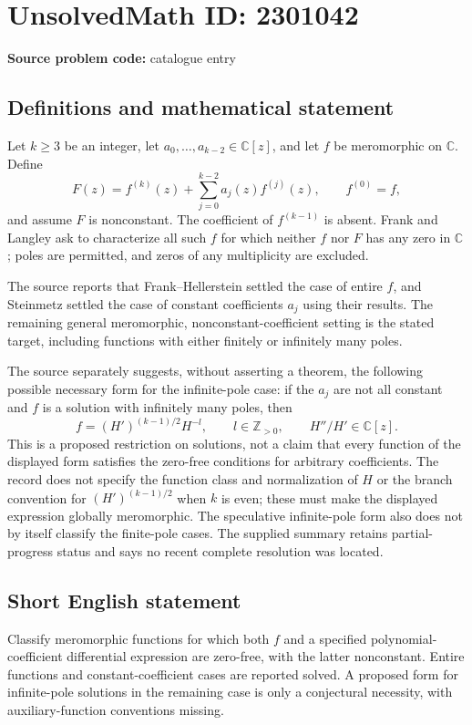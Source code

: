 \documentclass[11pt]{article}
\newcommand{\Z}{\mathbb{Z}}
\newcommand{\C}{\mathbb{C}}
\begin{document}
\section*{UnsolvedMath ID: 2301042}
\textbf{Source problem code:} catalogue entry
\subsection{Definitions and mathematical statement}
Let $k\geq3$ be an integer, let $a_0,\ldots,a_{k-2}\in\C[z]$, and let $f$ be meromorphic on $\C$. Define
\[
F(z)=f^{(k)}(z)+\sum_{j=0}^{k-2}a_j(z)f^{(j)}(z),
\qquad f^{(0)}=f,
\]
and assume $F$ is nonconstant. The coefficient of $f^{(k-1)}$ is absent. Frank and Langley ask to characterize all such $f$ for which neither $f$ nor $F$ has any zero in $\C$; poles are permitted, and zeros of any multiplicity are excluded.

The source reports that Frank--Hellerstein settled the case of entire $f$, and Steinmetz settled the case of constant coefficients $a_j$ using their results. The remaining general meromorphic, nonconstant-coefficient setting is the stated target, including functions with either finitely or infinitely many poles.

The source separately suggests, without asserting a theorem, the following possible necessary form for the infinite-pole case: if the $a_j$ are not all constant and $f$ is a solution with infinitely many poles, then
\[
f=(H')^{(k-1)/2}H^{-l},\qquad
l\in\Z_{>0},\qquad H''/H'\in\C[z].
\]
This is a proposed restriction on solutions, not a claim that every function of the displayed form satisfies the zero-free conditions for arbitrary coefficients. The record does not specify the function class and normalization of $H$ or the branch convention for $(H')^{(k-1)/2}$ when $k$ is even; these must make the displayed expression globally meromorphic. The speculative infinite-pole form also does not by itself classify the finite-pole cases. The supplied summary retains partial-progress status and says no recent complete resolution was located.
\subsection{Short English statement}
Classify meromorphic functions for which both $f$ and a specified polynomial-coefficient differential expression are zero-free, with the latter nonconstant. Entire functions and constant-coefficient cases are reported solved. A proposed form for infinite-pole solutions in the remaining case is only a conjectural necessity, with auxiliary-function conventions missing.
\end{document}
